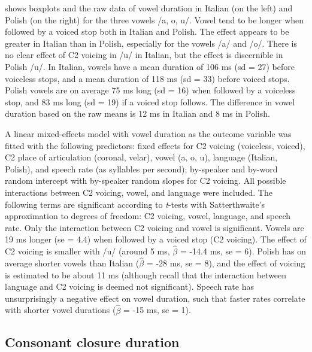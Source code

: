 \documentclass[preprint]{JASAnew}
\begin{document}
 shows boxplots and the raw data of vowel duration
in Italian (on the left) and Polish (on the right) for the three vowels
/a, o, u/. Vowel tend to be longer when followed by a voiced stop both
in Italian and Polish. The effect appears to be greater in Italian than
in Polish, especially for the vowels /a/ and /o/. There is no clear
effect of C2 voicing in /u/ in Italian, but the effect is discernible in
Polish /u/. In Italian, vowels have a mean duration of 106 ms (sd = 27)
before voiceless stops, and a mean duration of 118 ms (sd = 33) before
voiced stops. Polish vowels are on average 75 ms long (sd = 16) when
followed by a voiceless stop, and 83 ms long (sd = 19) if a voiced stop
follows. The difference in vowel duration based on the raw means is 12
ms in Italian and 8 ms in Polish.

A linear mixed-effects model with vowel duration as the outcome variable
was fitted with the following predictors: fixed effects for C2 voicing
(voiceless, voiced), C2 place of articulation (coronal, velar), vowel
(a, o, u), language (Italian, Polish), and speech rate (as syllables per
second); by-speaker and by-word random intercept with by-speaker random
slopes for C2 voicing. All possible interactions between C2 voicing,
vowel, and language were included. The following terms are significant
according to \emph{t}-tests with Satterthwaite's approximation to
degrees of freedom: C2 voicing, vowel, language, and speech rate. Only
the interaction between C2 voicing and vowel is significant. Vowels are
19 ms longer (se = 4.4) when followed by a voiced stop (C2 voicing). The
effect of C2 voicing is smaller with /u/ (around 5 ms, \(\hat{\beta}\) =
-14.4 ms, se = 6). Polish has on average shorter vowels than Italian
(\(\hat{\beta}\) = -28 ms, se = 8), and the effect of voicing is
estimated to be about 11 ms (although recall that the interaction
between language and C2 voicing is deemed not significant). Speech rate
has unsurprisingly a negative effect on vowel duration, such that faster
rates correlate with shorter vowel durations (\(\hat{\beta}\) = -15 ms,
se = 1).

\hypertarget{consonant-closure-duration}{%
\subsection{Consonant closure
duration}\label{consonant-closure-duration}}
\end{document}
